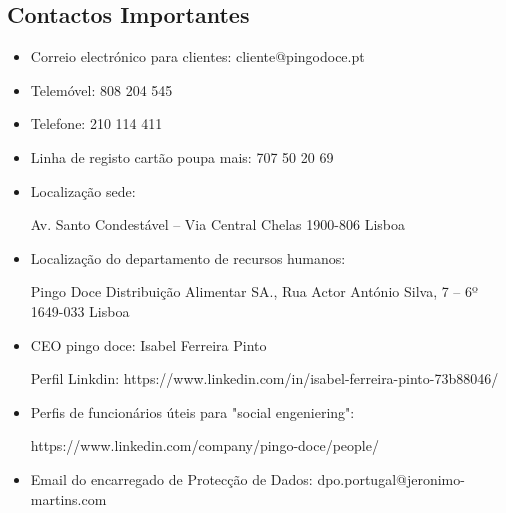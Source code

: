 \subsection{Contactos Importantes}
\begin{itemize}
\item Correio electrónico para clientes: cliente@pingodoce.pt\newline


\item Telemóvel: 808 204 545 \newline


\item Telefone:  210 114 411\newline


\item Linha de registo cartão poupa mais: 707 50 20 69\newline

\item Localização sede:\newline


\par Av. Santo Condestável – Via Central Chelas 1900-806 Lisboa\newline


\item Localização do departamento de recursos humanos: \newline


\par Pingo Doce Distribuição Alimentar SA., Rua Actor António Silva, 7 – 6º 1649-033 Lisboa \newline

\item CEO pingo doce: Isabel Ferreira Pinto\newline

\par Perfil Linkdin: https://www.linkedin.com/in/isabel-ferreira-pinto-73b88046/\newline

\item Perfis de funcionários úteis para "social engeniering":\newline

\par https://www.linkedin.com/company/pingo-doce/people/\newline

\item Email do encarregado de Protecção de Dados:  dpo.portugal@jeronimo-martins.com \newline
\end{itemize}


